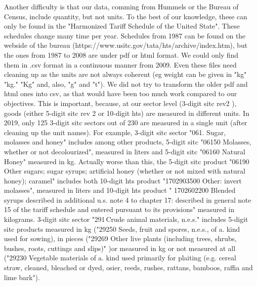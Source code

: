 \documentclass[a4paper,11pt]{article}
\begin{document}
\begin{itemize}
\begin{enumerate}
\begin{table}[htbp]
Another difficulty is that our data, comming from Hummels or the Bureau of Census, include quantity, but not units.
To the best of our knowledge, these can only be found in the "Harmonized Tariff Schedule of the United State".
These schedules change many time per year.
Schedules from 1987 can be found on the webside of the bureau (https://www.usitc.gov/tata/hts/archive/index.htm), but the ones from 1987 to 2008 are under pdf or html format.
We could only find them in .csv format in a continuous manner from 2009.
Even these files need cleaning up as the units are not always coherent (eg weight can be given in "kg" "kg." "Kg" and, also, "g" and "t").
We did not try to transform the older pdf and html ones into csv, as that would have been too much work compared to our objectives.
This is important, because, at our sector level (3-digit  sitc rev2 ), goods (either 5-digit sitc rev 2 or 10-digit hts) are measured in different units.
In 2019, only 125 3-digit sitc sectors out of 230 are measured in a single unit (after cleaning up the unit names).
For example, 3-digit sitc sector "061. Sugar, molasses and honey" includes among other products, 5-digit sitc "06150 Molasses, whether or not decolourized", measured in liters and 5-digit sitc "06160 Natural Honey" measured in kg.
Actually worse than this, the 5-digit sitc product "06190 Other sugars; sugar syrups; artificial honey (whether or not mixed with natural honey); caramel" includes both 10-digit hts product "1702903500 Other: invert molasses", measured in liters and 10-digit hts product " 1702602200 Blended syrups described in additional u.s. note 4 to chapter 17: described in general note 15 of the tariff schedule and entered pursuant to its provisions"  measured in kilograms.
3-digit sitc sector "291 Crude animal materials, n.e.s." includes 5-digit sitc products measured in kg ("29250 Seeds, fruit and spores, n.e.s., of a. kind used for sowing), in pieces ("29269 Other live plants (including trees, shrubs, bushes, roots, cuttings and slips)" )or measured in kg or not measured at all ("29230 Vegetable materials of a. kind used primarily for plaiting (e.g. cereal straw, cleaned, bleached or dyed, osier, reeds, rushes, rattans, bamboos, raffia and lime bark").




\end{table}
\end{enumerate}
\end{itemize}
\end{document}
